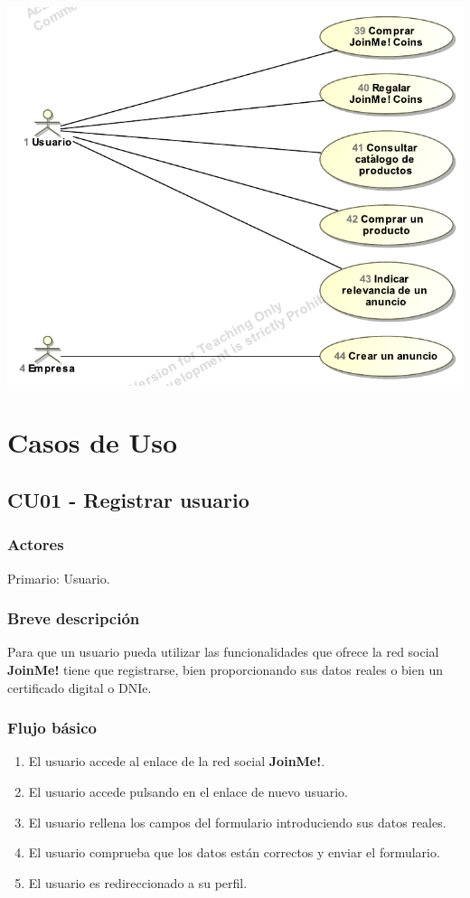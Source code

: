 \documentclass[12pt, a4paper, titlepage]{article}
\begin{document}
\begin{center}
\includegraphics[scale=0.9]{Imagenes/casosUso6}
\end{center}

\newpage






\section{Casos de Uso}

\subsection{CU01 - Registrar usuario}
\subsubsection{Actores}
Primario: Usuario.
\subsubsection{Breve descripción}
Para que un usuario pueda utilizar las funcionalidades que ofrece la red social \textbf{JoinMe!} tiene que registrarse, bien proporcionando sus datos reales o bien un certificado digital o DNIe.
\subsubsection{Flujo básico}
\begin{enumerate}
	\item El usuario accede al enlace de la red social \textbf{JoinMe!}.
	\item El usuario accede pulsando en el enlace de nuevo usuario.
	\item El usuario rellena los campos del formulario introduciendo sus datos reales.
	\item El usuario comprueba que los datos están correctos y enviar el formulario.
	\item El usuario es redireccionado a su perfil.
\end{enumerate}
\end{document}
